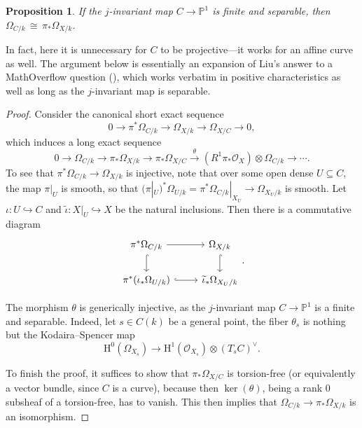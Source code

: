 \documentclass[11pt, letterpaper]{amsart}
\theoremstyle{plain}
\newtheorem{proposition}[theorem]{Proposition}
\theoremstyle{definition}
\newcommand{\IP}{\mathbb{P}}
\newcommand\iso{\,{\cong}\,}
\newcommand\tensor{{\otimes}}
\newcommand{\<}{\langle}
\renewcommand{\>}{\rangle}
\newcommand{\into}{\hookrightarrow}
\def\wt{\widetilde}
\newcommand{\Ohm}{\Omega}
\newcommand{\sO}{\mathcal{O}}
\renewcommand{\H}{\mathrm{H}}
\begin{document}
\begin{proposition} \label{prop: Liu's lemma} If the $j$-invariant map $C \to \IP^1$ is finite and separable, then $\Ohm_{C/k} \iso \pi_* \Ohm_{X/ k}$. 
\end{proposition}
In fact, here it is unnecessary for $C$ to be projective---it works for an affine curve as well. The argument below is essentially an expansion of Liu's answer to a MathOverflow question (\cite{LiuAnswer}), which works verbatim in positive characteristics as well as long as the $j$-invariant map is separable.
\begin{proof} Consider the canonical short exact sequence 
    $$ 0 \to \pi^* \Omega_{C/k} \to \Omega_{X/k} \to \Omega_{X/C} \to 0,  $$
    which induces a long exact sequence 
    $$ 0 \to \Omega_{C/k} \to \pi_* \Ohm_{X/k} \to \pi_* \Ohm_{X/C} \stackrel{\theta}{\to} (R^1 \pi_* \sO_X) \tensor \Ohm_{C/k} \to \cdots. $$
    To see that $\pi^* \Omega_{C/k} \to \Omega_{X/k}$ is injective, note that over some open dense $U \subseteq C$, the map $\pi|_U$ is smooth, so that $(\pi|_U)^* \Omega_{U/k} = \pi^* \Omega_{C/k} |_{X_U} \to \Omega_{X_U/k}$ is smooth.     
    Let $\iota : U \into C$ and $\wt{\iota} : X|_U \into X$ be the natural inclusions. Then there is a commutative diagram
    \[\begin{tikzcd}
	{\pi^* \Omega_{C/k}} & {\Omega_{X/k}} \\
	{\pi^*(\iota_* \Omega_{U/k})} & {\wt{\iota}_* \Omega_{X_U/k}}
	\arrow[from=1-1, to=1-2]
	\arrow[hook, from=1-1, to=2-1]
	\arrow[hook, from=1-2, to=2-2]
	\arrow[hook, from=2-1, to=2-2]
    \end{tikzcd}.\]

    
    The morphism $\theta$ is generically injective, as the $j$-invariant map $C \to \IP^1$ is a finite and separable. Indeed, let $s \in C(k)$ be a general point, the fiber $\theta_s$ is nothing but the Kodaira--Spencer map 
    $$ \H^0(\Ohm_{X_s}) \to \H^1(\sO_{X_s}) \tensor (T_s C)^\vee.  $$
    
    To finish the proof, it suffices to show that $\pi_* \Ohm_{X/C}$ is torsion-free (or equivalently a vector bundle, since $C$ is a curve), because then $\ker(\theta)$, being a rank $0$ subsheaf of a torsion-free, has to vanish. 
    This then implies that $\Ohm_{C/k} \to \pi_* \Ohm_{X/k}$ is an isomorphism.   


\end{proof}
\end{document}
